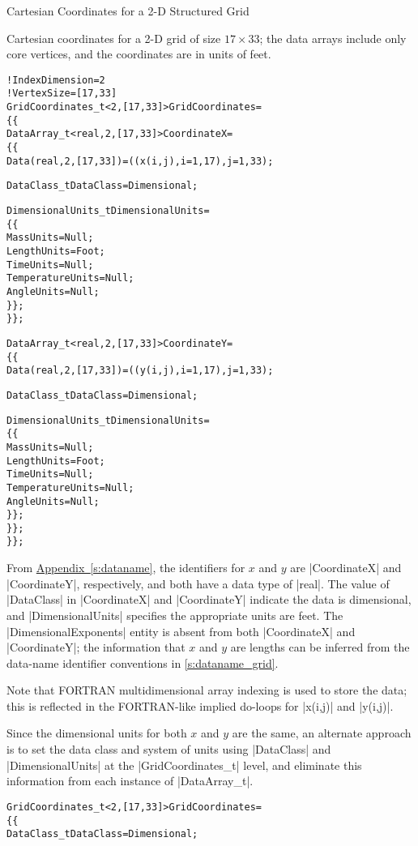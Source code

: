 \begin{example}{Cartesian Coordinates for a 2-D Structured Grid}
\label{ex:grid1}

Cartesian coordinates for a 2-D grid of size $17\times33$; the data
arrays include only core vertices, and the coordinates are in units of feet.
\begin{alltt}
  !  IndexDimension = 2
  !  VertexSize = [17,33]
  GridCoordinates\_t<2, [17,33]> GridCoordinates =
    \{\{
    DataArray\_t<real, 2, [17,33]> CoordinateX =
      \{\{
      Data(real, 2, [17,33]) = ((x(i,j), i=1,17), j=1,33) ;

      DataClass\_t DataClass = Dimensional ;
      
      DimensionalUnits\_t DimensionalUnits = 
        \{\{ 
        MassUnits        = Null ;
        LengthUnits      = Foot ;
        TimeUnits        = Null ;
        TemperatureUnits = Null ;
        AngleUnits       = Null ;
        \}\} ;
      \}\} ;

    DataArray\_t<real, 2, [17,33]> CoordinateY =
      \{\{
      Data(real, 2, [17,33]) = ((y(i,j), i=1,17), j=1,33) ;

      DataClass\_t DataClass = Dimensional ;
      
      DimensionalUnits\_t DimensionalUnits = 
        \{\{ 
        MassUnits        = Null ;
        LengthUnits      = Foot ;
        TimeUnits        = Null ;
        TemperatureUnits = Null ;
        AngleUnits       = Null ;
        \}\} ;
      \}\} ;
    \}\} ;
\end{alltt}
From \hyperref[s:dataname]{Appendix~\ref*{s:dataname}}, the identifiers
for $x$ and $y$ are |CoordinateX| and |CoordinateY|, respectively, and
both have a data type of |real|.
The value of |DataClass| in |CoordinateX| and |CoordinateY| indicate
the data is dimensional, and |DimensionalUnits| specifies the appropriate
units are feet.
The |DimensionalExponents| entity is absent from both |CoordinateX| and
|CoordinateY|; the information that $x$ and $y$ are lengths can be
inferred from the data-name identifier conventions in
\autoref{s:dataname_grid}.

Note that FORTRAN multidimensional array indexing is used to store
the data; this is reflected in the FORTRAN-like implied do-loops for
|x(i,j)| and |y(i,j)|.

Since the dimensional units for both $x$ and $y$ are the same, an
alternate approach is to set the data class and system of units using
|DataClass| and |DimensionalUnits| at the |GridCoordinates_t| level, and
eliminate this information from each instance of |DataArray_t|.
\begin{alltt}
  GridCoordinates\_t<2, [17,33]> GridCoordinates =
    \{\{
    DataClass\_t DataClass = Dimensional ;
    

\end{alltt}
\end{example}

